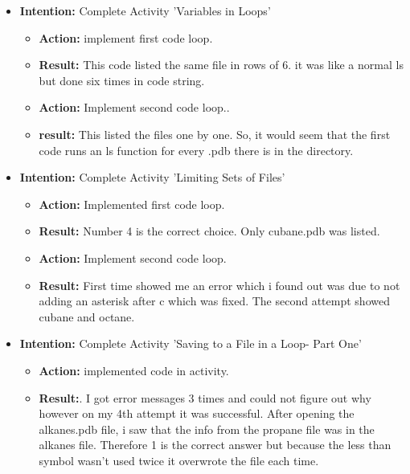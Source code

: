 \documentclass{article}
\begin{document}
\begin{itemize}

\item{\textbf{Intention:} Complete Activity 'Variables in Loops'}

\begin{itemize}
\item{\textbf{Action:} implement first code loop.}

\item{\textbf{Result:} This code listed the same file in rows of 6. it was like a normal ls but done six times in code string.}

\item{\textbf{Action:}  Implement second code loop..}

\item{\textbf{result:} This listed the files one by one. So, it would seem that the first code runs an ls function for every .pdb there is in the directory.}

\end{itemize}

\item{\textbf{Intention:} Complete Activity 'Limiting Sets of Files'}

\begin{itemize}
\item{\textbf{Action:} Implemented first code loop.}

\item{\textbf{Result:} Number 4 is the correct choice. Only cubane.pdb was listed.}

\item{\textbf{Action:} Implement second code loop.}

\item{\textbf{Result:} First time showed me an error which i found out was due to not adding an asterisk after c which was fixed. The second attempt showed cubane and octane.}


\end{itemize}

\item{\textbf{Intention:} Complete Activity 'Saving to a File in a Loop- Part One'}

\begin{itemize}
\item{\textbf{Action:} implemented code in activity.}

\item{\textbf{Result:}. I got error messages 3 times and could not figure out why however on my 4th attempt it was successful. After opening the alkanes.pdb file, i saw that the info from the propane file was in the alkanes file. Therefore 1 is the correct answer but because the less than symbol wasn't used twice it overwrote the file each time.}


\end{itemize}
\end{itemize}
\end{document}
